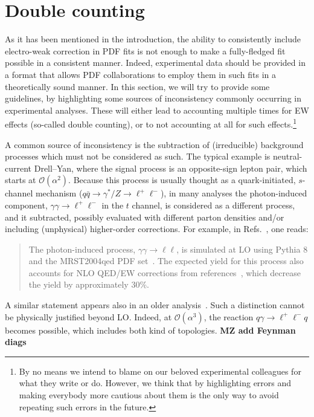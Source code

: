 \section{Double counting}
\label{sec:doublecounting}

As it has been mentioned in the introduction, the ability to consistently include electro-weak correction in
PDF fits is not enough to make a fully-fledged fit possible in a consistent manner. Indeed, experimental data should
be provided in  a format that allows PDF collaborations to employ them in such fits in a theoretically sound manner. In this
section, we will try to provide some guidelines, by highlighting some sources of inconsistency commonly occurring in experimental 
analyses. These will either lead to accounting multiple times for EW effects (so-called double counting), or to not accounting at
all for such effects.\footnote{By no means we intend to blame on our beloved experimental colleagues for what they write or do. However,
    we think that by highlighting errors and making everybody more cautious about them is the only way to avoid repeating such
    errors in the future.}

A common source of inconsistency is the subtraction of (irreducible) background processes which must not be considered as such. The typical example
is neutral-current Drell--Yan, where the signal process is an opposite-sign lepton pair, which starts
at $\mathcal O(\alpha^2)$. Because this process is usually thought
as a quark-initiated, $s$-channel mechanism ($q\bar q \to \gamma^*/Z \to \ell^+ \ell^-$), in many analyses the photon-induced component,
$\gamma \gamma \to \ell^+ \ell^-$ in the $t$ channel, is considered as a different process, and it 
subtracted, possibly evaluated with different parton densities and/or including (unphysical) higher-order 
corrections. For example, in Refs.~\cite{Aaboud:2017ffb,Aad:2016zzw}, one reads:
\begin{quote}
The photon-induced process, $\gamma\gamma \to \ell \ell$, is simulated at LO using Pythia 8 
and the MRST2004qed PDF set~\cite{Martin:2004dh}. The expected yield for this process also accounts for 
NLO QED/EW corrections from references~\cite{Bardin:2012jk,Bondarenko:2013nu}, which decrease the yield by approximately 30\%.
\end{quote}
A similar statement appears also in an older analysis~\cite{Aad:2013iua}. Such a distinction cannot be physically
justified beyond LO\@. Indeed, at $\mathcal O(\alpha^3)$, the reaction $q \gamma \to \ell^+ \ell^- q$ becomes possible, which
includes both kind of topologies. {\bf MZ add Feynman diags}

